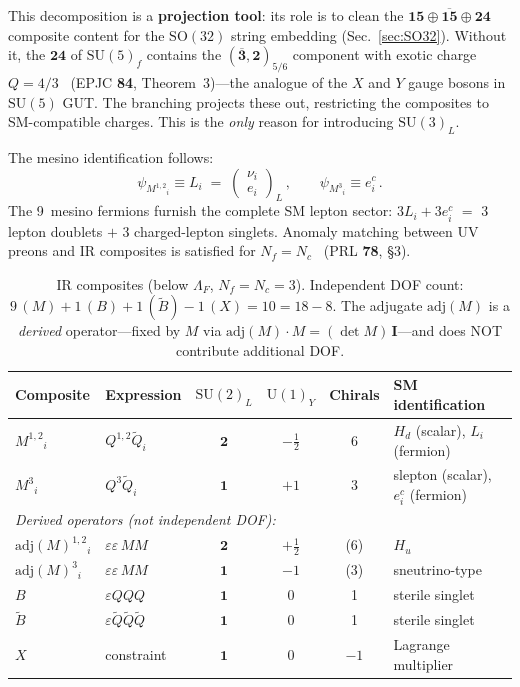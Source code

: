 \documentclass[12pt,a4paper]{article}
\newcommand{\SU}{\mathrm{SU}}
\newcommand{\UU}{\mathrm{U}}
\newcommand{\SO}{\mathrm{SO}}
\newcommand{\Nf}{N_{\!f}}
\newcommand{\Nc}{N_{\!c}}
\newcommand{\adj}{\mathrm{adj}}
\begin{document}
This decomposition is a \textbf{projection tool}: its role is
to clean the $\mathbf{15} \oplus \overline{\mathbf{15}} \oplus
\mathbf{24}$ composite content for the $\SO(32)$ string embedding
(Sec.~\ref{sec:SO32}).
Without it, the $\mathbf{24}$ of $\SU(5)_f$ contains the
$(\overline{\mathbf{3}}, \mathbf{2})_{5/6}$ component with
exotic charge $Q = 4/3$~\cite{Rivero:2024epjc}
(EPJC \textbf{84}, Theorem~3)---the analogue of the $X$ and $Y$
gauge bosons in $\SU(5)$ GUT.
The branching projects these out, restricting the composites
to SM-compatible charges.
This is the \emph{only} reason for introducing $\SU(3)_L$.

The mesino identification follows:
\begin{equation}
  \boxed{
  \psi_{M^{1,2}{}_i} \equiv L_i
  \;=\; \begin{pmatrix} \nu_i \\ e_i \end{pmatrix}_L\,,
  \qquad
  \psi_{M^{3}{}_i} \equiv e^c_i\,.}
  \label{eq:mesinos_leptons}
\end{equation}
The 9~mesino fermions furnish the complete SM lepton sector:
$3L_i + 3e^c_i$ $=$ 3 lepton doublets $+$ 3 charged-lepton
singlets.
Anomaly matching between UV preons and IR composites is satisfied
for $\Nf = \Nc$~\cite{CsakiSchmaltzSkiba:1997}
(PRL \textbf{78}, \S3).

\begin{table}[ht]
\centering\small
\caption{IR composites (below $\Lambda_F$, $\Nf = \Nc = 3$).
  Independent DOF count: $9\,(M) + 1\,(B) + 1\,(\tilde{B})
  - 1\,(X) = 10 = 18 - 8$.
  The adjugate $\adj(M)$ is a \emph{derived} operator---fixed
  by $M$ via $\adj(M)\cdot M = (\det M)\,\mathbf{I}$---and
  does NOT contribute additional DOF.}
\label{tab:IR_composites}
\begin{tabular}{llcccl}
\hline
Composite & Expression & $\SU(2)_L$ & $\UU(1)_Y$ & Chirals & SM identification \\
\hline
$M^{1,2}{}_i$ & $Q^{1,2}\tilde{Q}_i$ & $\mathbf{2}$ & $-\tfrac{1}{2}$ & 6 & $H_d$ (scalar), $L_i$ (fermion) \\
$M^{3}{}_i$ & $Q^{3}\tilde{Q}_i$ & $\mathbf{1}$ & $+1$ & 3 & slepton (scalar), $e^c_i$ (fermion) \\
\hline
\multicolumn{6}{l}{\textit{Derived operators (not independent DOF):}} \\
$\adj(M)^{1,2}{}_i$ & $\varepsilon\varepsilon\,MM$ & $\mathbf{2}$ & $+\tfrac{1}{2}$ & (6) & $H_u$ \\
$\adj(M)^{3}{}_i$ & $\varepsilon\varepsilon\,MM$ & $\mathbf{1}$ & $-1$ & (3) & sneutrino-type \\
$B$ & $\varepsilon QQQ$ & $\mathbf{1}$ & $0$ & 1 & sterile singlet \\
$\tilde{B}$ & $\varepsilon\tilde{Q}\tilde{Q}\tilde{Q}$ & $\mathbf{1}$ & $0$ & 1 & sterile singlet \\
$X$ & constraint & $\mathbf{1}$ & $0$ & $-1$ & Lagrange multiplier \\
\hline
\end{tabular}
\end{table}
\end{document}
